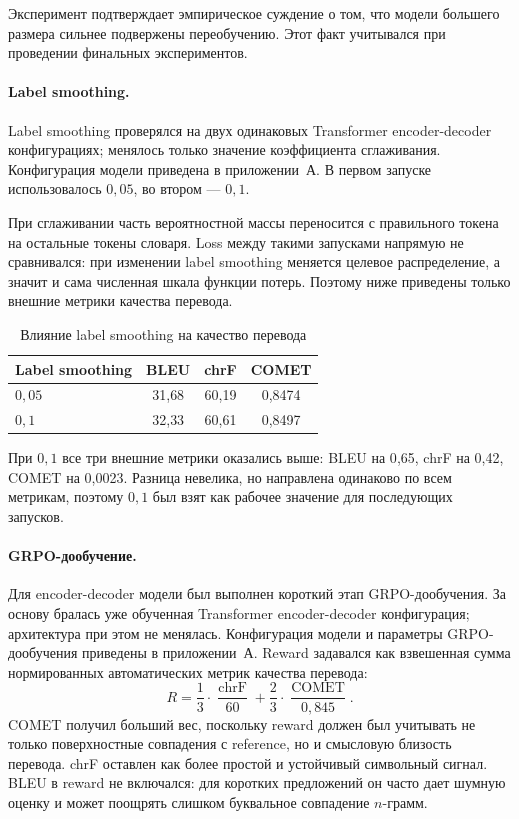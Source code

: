 Эксперимент подтверждает эмпирическое суждение о том, что модели большего размера сильнее подвержены переобучению. Этот факт учитывался при проведении финальных экспериментов.

\paragraph{Label smoothing.}
Label smoothing проверялся на двух одинаковых Transformer encoder-decoder конфигурациях; менялось только значение коэффициента сглаживания. Конфигурация модели приведена в приложении~А. В первом запуске использовалось $0{,}05$, во втором --- $0{,}1$.

При сглаживании часть вероятностной массы переносится с правильного токена на остальные токены словаря.
Loss между такими запусками напрямую не сравнивался: при изменении label smoothing меняется целевое распределение, а значит и сама численная шкала функции потерь. Поэтому ниже приведены только внешние метрики качества перевода.

\begin{table}[H]
	\centering
	\caption{Влияние label smoothing на качество перевода}
	\label{tab:label-smoothing-comparison}
	\begin{tabular}{|p{}|c|c|c|}
		\hline
		\textbf{Label smoothing} & \textbf{BLEU} & \textbf{chrF} & \textbf{COMET} \\
		\hline
		$0{,}05$                 & 31{,}68       & 60{,}19       & 0{,}8474       \\
		\hline
		$0{,}1$                  & 32{,}33       & 60{,}61       & 0{,}8497       \\
		\hline
	\end{tabular}
\end{table}

При $0{,}1$ все три внешние метрики оказались выше: BLEU на 0{,}65, chrF на 0{,}42, COMET на 0{,}0023. Разница невелика, но направлена одинаково по всем метрикам, поэтому $0{,}1$ был взят как рабочее значение для последующих запусков.

\paragraph{GRPO-дообучение.}
Для encoder-decoder модели был выполнен короткий этап GRPO-дообучения. За основу бралась уже обученная Transformer encoder-decoder конфигурация; архитектура при этом не менялась. Конфигурация модели и параметры GRPO-дообучения приведены в приложении~А. Reward задавался как взвешенная сумма нормированных автоматических метрик качества перевода:
\[
	R = \frac{1}{3} \cdot \frac{\operatorname{chrF}}{60} +
	\frac{2}{3} \cdot \frac{\operatorname{COMET}}{0{,}845}.
\]
COMET получил больший вес, поскольку reward должен был учитывать не только поверхностные совпадения с reference, но и смысловую близость перевода. chrF оставлен как более простой и устойчивый символьный сигнал. BLEU в reward не включался: для коротких предложений он часто дает шумную оценку и может поощрять слишком буквальное совпадение $n$-грамм.

